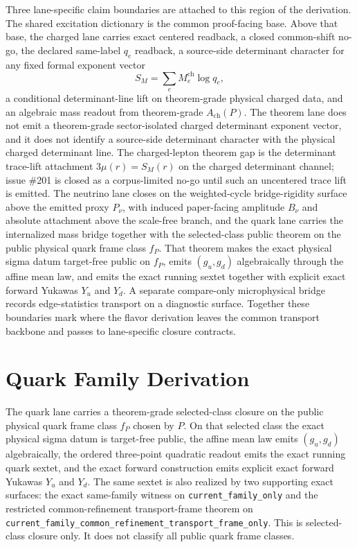 \documentclass[11pt]{article}
\begin{document}
Three lane-specific claim boundaries are attached to this region of the derivation. The shared
excitation dictionary is the common proof-facing base. Above that base, the charged lane carries
exact centered readback, a closed common-shift no-go, the declared same-label \(q_e\) readback, a
source-side determinant character for any fixed formal exponent vector
\[
S_M=\sum_e M_e^{\mathrm{ch}}\log q_e,
\]
a conditional determinant-line lift on theorem-grade physical charged data, and an algebraic mass
readout from theorem-grade \(A_{\mathrm{ch}}(P)\). The theorem lane does not emit a theorem-grade
sector-isolated charged determinant exponent vector, and it does not identify a source-side
determinant character with the physical charged determinant line. The charged-lepton theorem gap is the
determinant trace-lift attachment \(3\mu(r)=S_M(r)\) on the charged determinant channel; issue \#201 is closed as a corpus-limited no-go until such an uncentered trace lift is emitted. The neutrino lane closes on the weighted-cycle
bridge-rigidity surface above the emitted proxy \(P_\nu\), with induced paper-facing amplitude \(B_\nu\) and absolute attachment above the scale-free branch, and the quark
lane carries the internalized mass bridge together with the selected-class public theorem on the
public physical quark frame class \(f_P\). That theorem makes the exact physical sigma datum
target-free public on \(f_P\), emits \((g_u,g_d)\) algebraically through the affine mean law,
and emits the exact running sextet together with explicit exact forward Yukawas \(Y_u\) and
\(Y_d\). A separate compare-only microphysical bridge records edge-statistics transport on a
diagnostic surface. Together these boundaries mark where the flavor
derivation leaves the common transport backbone and passes to lane-specific closure contracts.

\section{Quark Family Derivation}

The quark lane carries a theorem-grade selected-class closure on the public physical quark frame
class \(f_P\) chosen by \(P\). On that selected class the exact physical sigma datum is
target-free public, the affine mean law emits \((g_u,g_d)\) algebraically, the ordered
three-point quadratic readout emits the exact running quark sextet, and the exact forward
construction emits explicit exact forward Yukawas \(Y_u\) and \(Y_d\). The same sextet is also
realized by two supporting exact surfaces: the exact same-family witness on
\texttt{current\_family\_only} and the restricted common-refinement
transport-frame theorem on
\texttt{current\_family\_common\_refinement\_transport\_frame\_only}. This is selected-class
closure only. It does not classify all public quark frame classes.
\end{document}
